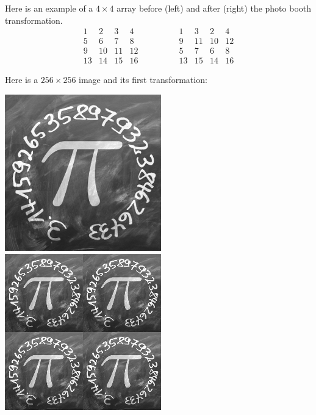 \documentclass[11pt,class=report,crop=false]{standalone}
\begin{document}
\begin{cours}
Here is an example of a $4\times 4$ array before (left) and after (right) the photo booth transformation. 
$$\begin{array}{cccc} 
  1& 2& 3& 4\\ 
  5& 6& 7& 8\\  
  9&10&11&12\\  
 13&14&15&16  
\end{array}\qquad\qquad  
\begin{array}{cccc} 
  1& 3& 2& 4\\  
  9&11&10&12\\  
  5& 7& 6& 8\\  
 13&15&14&16
\end{array}$$

Here is a $256 \times 256$ image and its first transformation:

\begin{center}
\includegraphics[scale=\myscale,scale=0.4]{images_chapter/pi_gimp_new_photo_0.png}\qquad\qquad
\includegraphics[scale=\myscale,scale=0.4]{images_chapter/pi_gimp_new_photo_1.png}
\end{center}


\end{cours}
\end{document}
